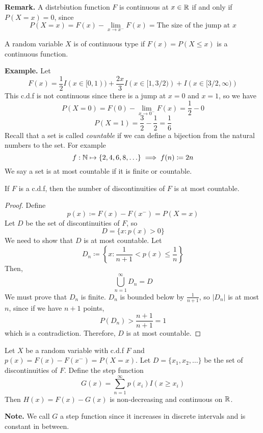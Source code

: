 \documentclass[openany]{report}
\begin{document}
\noindent
\textbf{Remark.} A distrbiution function $F$ is continuous at $x \in \mathbb{R}$ if and only if $P(X = x) = 0$, since 
\[P(X=x) = F(x) - \lim_{x \rightarrow x^-}F(x) = \text{The size of the jump at $x$}\]
\begin{definition}
    A random variable $X$ is of continuous type if $F(x) = P(X \leq x)$ is a continuous function. 
\end{definition}
\noindent
\textbf{Example.} Let 
\[F(x) = \frac{1}{2}I(x \in [0,1)) + \frac{2x}{3}I\left(x \in [1, 3/2)\right) + I\left(x \in [3/2, \infty)\right)\]
This c.d.f is not continuous since there is a jump at $x = 0$ and $x = 1$, so we have 
\[P(X = 0) = F(0) - \lim_{x\rightarrow 0^-} F(x) = \frac{1}{2} - 0\]
\[P(X = 1) = \frac{3}{2} - \frac{1}{2} = \frac{1}{6}\]
Recall that a set is called \emph{countable} if we can define a bijection from the natural numbers to the set. For example 
\[f:\mathbb{N} \mapsto \{2,4,6,8,\ldots\}  \implies f(n) \coloneqq 2n\]
We say a set is at most countable if it is finite or countable. 
\begin{lemma}
    If $F$ is a c.d.f, then the number of discontinuities of $F$ is at most countable.
\end{lemma}
\begin{proof}
    Define 
    \[p(x) \coloneqq F(x) - F(x^-) = P(X = x)\]
    Let $D$ be the set of discontinuities of $F$, so 
    \[D = \{x: p(x) > 0\}\]
    We need to show that $D$ is at most countable. Let 
    \[D_n \coloneqq \left\{x: \frac{1}{n+1} < p(x) \leq \frac{1}{n}\right\}\]
    Then, 
    \[\bigcup_{n=1}^\infty D_n = D\]
    We must prove that $D_n$ is finite. $D_n$ is bounded below by $\frac{1}{n+1}$, so $|D_n|$ is at most $n$, since if we have $n+1$ points, 
    \[P(D_n) > \frac{n+1}{n+1} = 1\]
    which is a contradiction. Therefore, $D$ is at most countable.
\end{proof}
\begin{lemma}
    Let $X$ be a random variable with c.d.f $F$ and $p(x) = F(x) - F(x^-) = P(X=x)$. Let $D = \{x_1,x_2, \ldots\} $ be the set of discontinuities of $F$. Define the step function 
    \[G(x) = \sum_{n=1}^\infty p(x_i)I(x \geq x_i)\]
    Then $H(x) = F(x) - G(x)$ is non-decreasing and continuous on $\mathbb{R}$.
\end{lemma}
\textbf{Note.} We call $G$ a step function since it increases in discrete intervals and is constant in between. \\[2ex]
\end{document}
